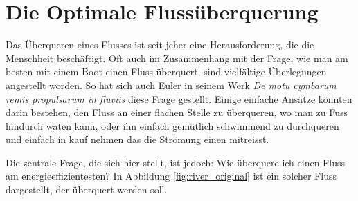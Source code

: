 \chapter{Die Optimale Flussüberquerung\label{chapter:schwimmen}}
\begin{refsection}


Das Überqueren eines Flusses ist seit jeher eine Herausforderung, die die Menschheit beschäftigt. Oft auch im Zusammenhang mit der Frage, wie man am besten mit einem Boot einen Fluss überquert, sind vielfältige Überlegungen angestellt worden. So hat sich auch Euler in seinem Werk \textit{De motu cymbarum remis propulsarum in fluviis} \cite{schwimmen:Euler_works} diese Frage gestellt. Einige einfache Ansätze könnten darin bestehen, den Fluss an einer flachen Stelle zu überqueren, wo man zu Fuss hindurch waten kann, oder ihn einfach gemütlich schwimmend zu durchqueren und einfach in kauf nehmen das die Strömung einen mitreisst.
	
	
Die zentrale Frage, die sich hier stellt, ist jedoch: Wie überquere ich einen Fluss am energieeffizientesten? In Abbildung \ref{fig:river_original} ist ein solcher Fluss dargestellt, der überquert werden soll.




\begin{figure}
    \centering

    \begin{tikzpicture}[x=0.75pt,y=0.75pt,yscale=-1,xscale=1]


\end{tikzpicture}
\end{figure}
\end{refsection}
